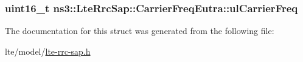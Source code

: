 \subsubsection[{\texorpdfstring{ul\+Carrier\+Freq}{ulCarrierFreq}}]{\setlength{\rightskip}{0pt plus 5cm}uint16\+\_\+t ns3\+::\+Lte\+Rrc\+Sap\+::\+Carrier\+Freq\+Eutra\+::ul\+Carrier\+Freq}\hypertarget{structns3_1_1LteRrcSap_1_1CarrierFreqEutra_a0b7492409484ac03d4bdf7719cb47a0a}{}\label{structns3_1_1LteRrcSap_1_1CarrierFreqEutra_a0b7492409484ac03d4bdf7719cb47a0a}


The documentation for this struct was generated from the following file\+:\begin{DoxyCompactItemize}
\item 
lte/model/\hyperlink{lte-rrc-sap_8h}{lte-\/rrc-\/sap.\+h}\end{DoxyCompactItemize}
